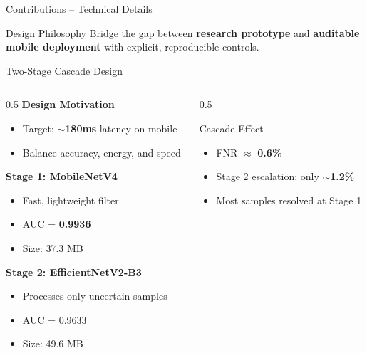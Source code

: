 \documentclass[aspectratio=169,12pt]{beamer}
\newcommand{\highlight}[1]{\textcolor{primaryblue}{\textbf{#1}}}
\newcommand{\successtext}[1]{\textcolor{successgreen}{\textbf{#1}}}
\begin{document}
\begin{frame}{Contributions – Technical Details}
\vspace{0.2em}
\begin{block}{\small Design Philosophy}
\small Bridge the gap between \highlight{research prototype} and \highlight{auditable mobile deployment} with explicit, reproducible controls.
\end{block}
\end{frame}

\begin{frame}{Two-Stage Cascade Design}
\begin{columns}[T]
\begin{column}{0.5\textwidth}
\textbf{Design Motivation}
\begin{itemize}
    \item Target: \highlight{$\sim$180ms} latency on mobile
    \item Balance accuracy, energy, and speed
\end{itemize}

\vspace{0.5em}
\textbf{Stage 1: MobileNetV4}
\begin{itemize}
    \item Fast, lightweight filter
    \item AUC = \highlight{0.9936}
    \item Size: 37.3 MB
\end{itemize}

\vspace{0.5em}
\textbf{Stage 2: EfficientNetV2-B3}
\begin{itemize}
    \item Processes only uncertain samples
    \item AUC = 0.9633
    \item Size: 49.6 MB
\end{itemize}
\end{column}

\begin{column}{0.5\textwidth}


\vspace{1em}
\begin{block}{Cascade Effect}
\begin{itemize}
    \item FNR $\approx$ \successtext{0.6\%}
    \item Stage 2 escalation: only \successtext{$\sim$1.2\%}
    \item Most samples resolved at Stage 1
\end{itemize}
\end{block}
\end{column}
\end{columns}
\end{frame}
\end{document}
